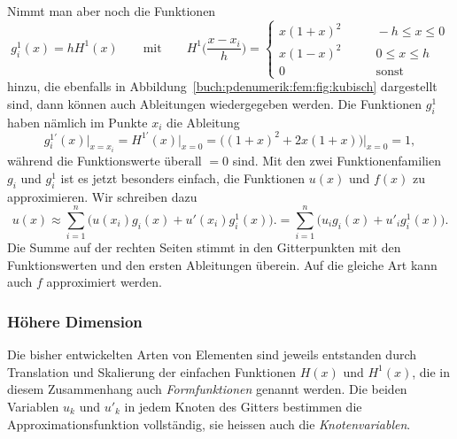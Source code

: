 Nimmt man aber noch die Funktionen
\[
g^1_i(x)
=
hH^1(x)
\qquad\text{mit}\qquad
H^1\biggl(\frac{x-x_i}{h}\biggr)
=
\begin{cases}
x(1+x)^2         &\qquad -h\le x \le 0\\
x(1-x)^2         &\qquad 0\le x \le h\\
0                &\qquad\text{sonst}
\end{cases}
\]
hinzu, die ebenfalls in Abbildung~\ref{buch:pdenumerik:fem:fig:kubisch}
dargestellt sind, dann können auch Ableitungen wiedergegeben werden.
Die Funktionen $g_i^1$ haben nämlich im Punkte $x_i$ die Ableitung
\[
g^{1\prime}_i(x)\big|_{x=x_i}
=
H^{1\prime}(x)\big|_{x=0}
=
\bigl(
(1+x)^2+2x(1+x)
\bigr)\big|_{x=0}
=
1,
\]
während die Funktionswerte überall $=0$ sind.
Mit den zwei Funktionenfamilien $g_i$ und $g^1_i$ ist es jetzt
besonders einfach, die Funktionen $u(x)$ und $f(x)$ zu approximieren.
Wir schreiben dazu
\begin{equation}
u(x)
\approx
\sum_{i=1}^n \bigl(u(x_i) g_i(x) + u'(x_i) g_i^1(x)\bigr).
=
\sum_{i=1}^n \bigl(u_i g_i(x) + u'_i g_i^1(x)\bigr).
\label{buch:pdenumerik:fem:eqn:approx}
\end{equation}
Die Summe auf der rechten Seiten stimmt in den Gitterpunkten mit den
Funktionswerten und den ersten Ableitungen überein.
Auf die gleiche Art kann auch $f$ approximiert werden.

\subsubsection{Höhere Dimension}
Die bisher entwickelten Arten von Elementen sind jeweils entstanden
durch Translation und Skalierung der einfachen Funktionen $H(x)$ und
$H^1(x)$, die in diesem Zusammenhang auch \emph{Formfunktionen} genannt werden.
%
Die beiden Variablen $u_k$ und $u'_k$ in jedem Knoten des Gitters
bestimmen die Approximationsfunktion vollständig, sie heissen auch
die \emph{Knotenvariablen}.
%

